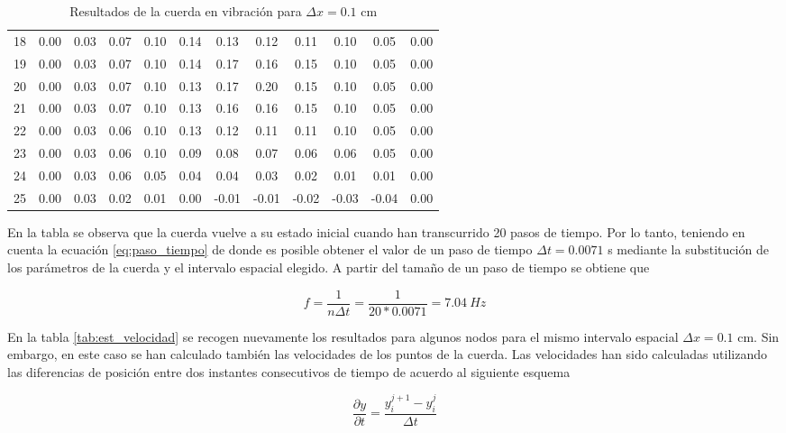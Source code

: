 \documentclass[11pt]{article}
\begin{document}
\begin{table}
\begin{small}
\begin{tabular}{ c c c c c c c c c c c c }
18 & 0.00 & 0.03 & 0.07 & 0.10 & 0.14 & 0.13 & 0.12 & 0.11 & 0.10 & 0.05 & 0.00 \\
19 & 0.00 & 0.03 & 0.07 & 0.10 & 0.14 & 0.17 & 0.16 & 0.15 & 0.10 & 0.05 & 0.00 \\
\hline
20 & 0.00 & 0.03 & 0.07 & 0.10 & 0.13 & 0.17 & 0.20 & 0.15 & 0.10 & 0.05 & 0.00 \\
\hline
21 & 0.00 & 0.03 & 0.07 & 0.10 & 0.13 & 0.16 & 0.16 & 0.15 & 0.10 & 0.05 & 0.00 \\
22 & 0.00 & 0.03 & 0.06 & 0.10 & 0.13 & 0.12 & 0.11 & 0.11 & 0.10 & 0.05 & 0.00 \\
23 & 0.00 & 0.03 & 0.06 & 0.10 & 0.09 & 0.08 & 0.07 & 0.06 & 0.06 & 0.05 & 0.00 \\
24 & 0.00 & 0.03 & 0.06 & 0.05 & 0.04 & 0.04 & 0.03 & 0.02 & 0.01 & 0.01 & 0.00 \\
25 & 0.00 & 0.03 & 0.02 & 0.01 & 0.00 & -0.01 & -0.01 & -0.02 & -0.03 & -0.04 & 0.00 \\
\end{tabular}
\end{small}
\caption{Resultados de la cuerda en vibración para $\Delta{x} = 0.1$ cm}
\label{tab:est_freq}
\end{table}

En la tabla se observa que la cuerda vuelve a su estado inicial cuando han transcurrido
20 pasos de tiempo. Por lo tanto, teniendo en cuenta la ecuación \ref{eq:paso_tiempo} de
donde es posible obtener el valor de un paso de tiempo $\Delta{t} = 0.0071$ s mediante la
substitución de los parámetros de la cuerda y el intervalo espacial elegido. A partir del
tamaño de un paso de tiempo se obtiene que

\begin{equation}
f = \frac{1}{n \Delta{t}} = \frac{1}{20 * 0.0071} = 7.04~Hz
\end{equation}

En la tabla \ref{tab:est_velocidad} se recogen nuevamente los resultados para algunos nodos
para el mismo intervalo espacial $\Delta{x} = 0.1$ cm. Sin embargo, en este caso se han
calculado también las velocidades de los puntos de la cuerda. Las velocidades han sido
calculadas utilizando las diferencias de posición entre dos instantes consecutivos de
tiempo de acuerdo al siguiente esquema

\begin{equation}
\frac{\partial{y}}{\partial{t}} = \frac{y^{j + 1}_i - y^{j}_i}{\Delta{t}}
\end{equation} 
\end{document}
